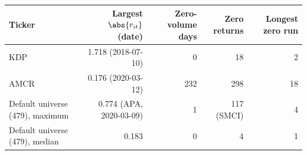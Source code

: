 \begin{tabular}{lrrrr}
\toprule
Ticker & Largest $\abs{r_{it}}$ (date) & Zero-volume days & Zero \TRAIN{} returns & Longest zero run \\
\midrule
KDP & 1.718 (2018-07-10) & 0 & 18 & 2 \\
AMCR & 0.176 (2020-03-12) & 232 & 298 & 18 \\
Default universe (479), maximum & 0.774 (APA, 2020-03-09) & 1 & 117 (SMCI) & 4 \\
Default universe (479), median & 0.183 & 0 & 4 & 1 \\
\bottomrule
\end{tabular}
